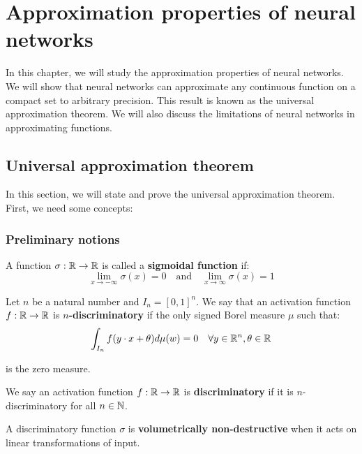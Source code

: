 \chapter{Approximation properties of neural networks}

In this chapter, we will study the approximation properties of neural networks. 
We will show that neural networks can approximate any continuous function on a 
compact set to arbitrary precision. This result is known as the universal 
approximation theorem. We will also discuss the limitations of neural networks in 
approximating functions.

\section{Universal approximation theorem}

In this section, we will state and prove the universal approximation theorem.
First, we need some concepts:

\subsection{Preliminary notions}

\begin{definition}
    A function $\sigma: \mathbb{R} \to \mathbb{R}$ is called a \textbf{sigmoidal function} if:
    $$\lim_{x \to -\infty} \sigma(x) = 0 \quad \text{and} \quad \lim_{x \to \infty} \sigma(x) = 1$$
\end{definition}

\begin{definition}
    Let $n$ be a natural number and $I_n = [0, 1]^n$. We say that an activation function
    $f: \mathbb{R} \to \mathbb{R}$ is \textbf{$n$-discriminatory} if the only signed Borel measure $\mu$ such that:
    $$\int_{I_n} f(y \cdot x + \theta) d\mu(w) = 0 \quad \forall y \in \mathbb{R}^n, \theta \in \mathbb{R}$$

    is the zero measure.
\end{definition}

\begin{definition}
    We say an activation function $f: \mathbb{R} \to \mathbb{R}$ is \textbf{discriminatory} if it is 
    $n$-discriminatory for all $n \in \mathbb{N}$.
\end{definition}

\begin{remark}
    A discriminatory function $\sigma$ is \textbf{volumetrically non-destructive} when 
    it acts on linear transformations of input.
\end{remark}

